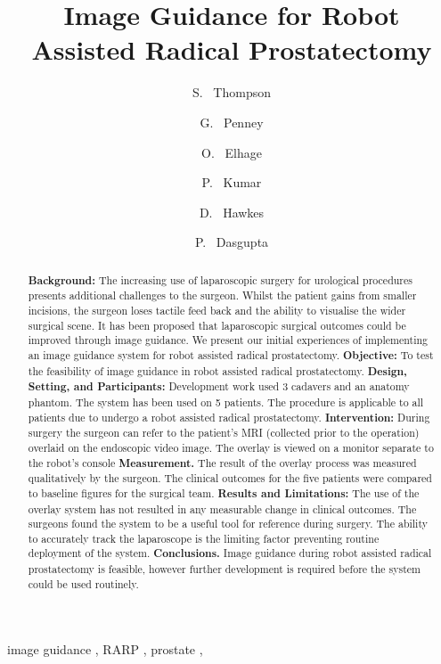 \documentclass[3p,twocolumn,preprint,10pt]{elsarticle}
\begin{document}
\begin{frontmatter}
\title{Image Guidance for Robot Assisted Radical Prostatectomy}
\author[cmic]{S. ~Thompson}
\author[kings]{G. ~Penney}
\author[Guys]{O. ~Elhage}
\author[Guys]{P. ~Kumar}
\author[cmic]{D. ~Hawkes}
\author[Guys]{P. ~Dasgupta}
\address[cmic]{Centre for Medical Image Computing, UCL, London WC1E 6DP, UK}
\address[kings]{Interdisciplinary Medical Imaging Group, Kings College London, London, UK}
\address[Guys]{MRC Centre for Transplantation, NHIR Biomedical Research Centre, King's Health Partners, Guy's Hospital, London, UK}
\begin{abstract}
{\bf Background:}
The increasing use of laparoscopic surgery for urological procedures presents
additional challenges to the surgeon. Whilst the patient gains from smaller
incisions, the surgeon loses tactile feed back and the ability to 
visualise the wider surgical scene. It has been proposed that 
laparoscopic surgical outcomes could be improved through image guidance. 
We present our initial experiences of implementing an image guidance 
system for robot assisted radical prostatectomy. \newline
{\bf Objective:}
To test the feasibility of image guidance in robot assisted radical 
prostatectomy. \newline
{\bf Design, Setting, and Participants:}
Development work used 3 cadavers and an anatomy phantom.
The system has been used on 5 patients. The procedure is applicable to all
patients due to undergo a robot assisted radical prostatectomy. \newline
{\bf Intervention:}
During surgery the surgeon can refer to the patient's MRI (collected prior to the
operation) overlaid on the endoscopic video image. The overlay is viewed on a
monitor separate to the robot's console \newline
{\bf Measurement.}
The result of the overlay process was measured qualitatively by the surgeon. The 
clinical outcomes for the five patients were compared to baseline figures for
the surgical team. \newline
{\bf Results and Limitations:}
The use of the overlay system has not resulted in any measurable change in clinical 
outcomes. The surgeons found the system to be a useful tool for reference during 
surgery. The ability to accurately track the laparoscope is the limiting factor
preventing routine deployment of the system. \newline
{\bf Conclusions.}
Image guidance during robot assisted radical prostatectomy is feasible, however 
further development is required before the system could be 
used routinely. \newline
\end{abstract}
\begin{keyword}
image guidance \sep
RARP \sep
prostate \sep
\end{keyword}
\end{frontmatter}
\end{document}
